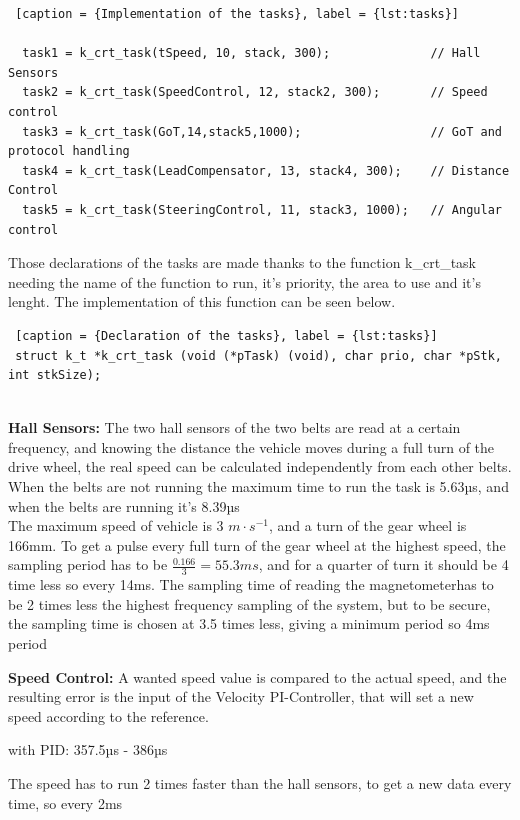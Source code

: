 \begin{lstlisting} [caption = {Implementation of the tasks}, label = {lst:tasks}]

  task1 = k_crt_task(tSpeed, 10, stack, 300);         	   // Hall Sensors
  task2 = k_crt_task(SpeedControl, 12, stack2, 300); 	   // Speed control
  task3 = k_crt_task(GoT,14,stack5,1000);        		   // GoT and protocol handling
  task4 = k_crt_task(LeadCompensator, 13, stack4, 300);    // Distance Control
  task5 = k_crt_task(SteeringControl, 11, stack3, 1000);   // Angular control

\end{lstlisting}

Those declarations of the tasks are made thanks to the function k\_crt\_task needing the name of the function to run, it's priority, the area to use and it's lenght. The implementation of this function can be seen below.


\begin{lstlisting} [caption = {Declaration of the tasks}, label = {lst:tasks}]
 struct k_t *k_crt_task (void (*pTask) (void), char prio, char *pStk, int stkSize);
 
\end{lstlisting}

\textbf{Hall Sensors:}
The two hall sensors of the two belts are read at a certain frequency, and knowing the distance the vehicle moves during a full turn of the drive wheel, the real speed can be calculated independently from each other belts.\\
When the belts are not running the maximum time to run the task is 5.63µs, and when the belts are running it's 8.39µs\\
The maximum speed of vehicle is 3 $m \cdot s^{-1}$, and a turn of the gear wheel is 166mm. To get a pulse every full turn of the gear wheel at the highest speed, the sampling period has to be $\frac{0.166}{3}={55.3ms}$, and for a quarter of turn it should be 4 time less so every 14ms. The sampling time of reading the magnetometerhas to be 2 times less the highest frequency sampling of the system, but to be secure, the sampling time is chosen at 3.5 times less, giving a minimum period so 4ms period

\textbf{Speed Control:}
A wanted speed value is compared to the actual speed, and the resulting error is the input of the Velocity PI-Controller, that will set a new speed according to the reference.

with PID: 357.5µs - 386µs

The speed has to run 2 times faster than the hall sensors, to get a new data every time, so every 2ms


